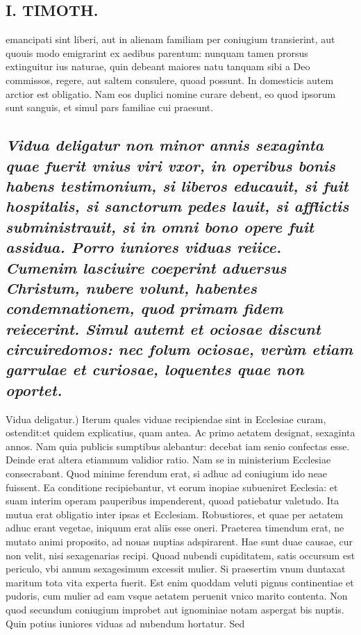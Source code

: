 \documentclass{article}
\begin{document}
\begin{pages}
\section*{I. TIMOTH. }
\marginpar{[ p.60 ]}\pstart emancipati sint liberi, aut in alienam familiam per coniugium transierint, aut quouis modo emigrarint ex aedibus parentum: nunquam tamen prorsus extinguitur ius naturae, quin debeant maiores natu tanquam sibi a Deo commissos, regere, aut saltem consulere, quoad possunt. In domesticis autem arctior est obligatio. Nam eos duplici nomine curare debent, eo quod ipsorum sunt sanguis, et simul pars familiae cui praesunt.  \pend
{}
{}
\subsection*{\textit{Vidua deligatur non minor annis sexaginta quae fuerit vnius viri vxor, in operibus bonis habens testimonium, si liberos educauit, si fuit hospitalis, si sanctorum pedes lauit, si afflictis subministrauit, si in omni bono opere fuit assidua. Porro iuniores viduas reiice. Cumenim lasciuire coeperint aduersus Christum, nubere volunt, habentes condemnationem, quod primam fidem reiecerint. Simul autemt et ociosae discunt circuiredomos: nec folum ociosae, verùm etiam garrulae et curiosae, loquentes quae non oportet. }}\pstart Vidua deligatur.) Iterum quales viduae recipiendae sint in Ecclesiae curam, ostendit:et quidem explicatius, quam antea. Ac primo aetatem designat, sexaginta annos. Nam quia publicis sumptibus alebantur: decebat iam senio confectas esse. Deinde erat altera etiamnum validior ratio. Nam se in ministerium Ecclesiae consecrabant. Quod minime ferendum erat, si adhuc ad coniugium ido neae fuissent. Ea conditione recipiebantur, vt eorum inopiae subueniret Eeclesia: et suam interim operam pauperibus impenderent, quoad patiebatur valetudo. Ita mutua erat obligatio inter ipsas et Ecclesiam. Robustiores, et quae per aetatem adhuc erant vegetae, iniquum erat aliïs esse oneri. Praeterea timendum erat, ne mutato animi proposito, ad nouas nuptias adspirarent. Hae sunt duae causae, cur non velit, nisi sexagenarias recipi. Quoad nubendi cupiditatem, satis occursum est periculo, vbi annum sexagesimum excessit mulier. Si praesertim vnum duntaxat maritum tota vita experta fuerit. Est enim quoddam veluti pignus continentiae et pudoris, cum mulier ad eam vsque aetatem peruenit vnico marito contenta. Non quod secundum coniugium improbet aut ignominiae notam aspergat bis nuptis. Quin potius iuniores viduas ad nubendum hortatur. Sed  \pend

\end{pages}
\end{document}
